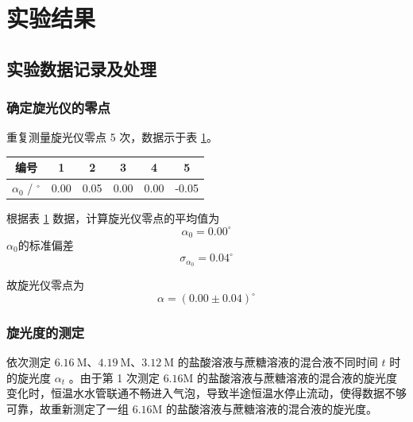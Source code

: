 \section{实验结果}

\subsection{实验数据记录及处理}

\subsubsection{确定旋光仪的零点}

重复测量旋光仪零点 5 次，数据示于表 \ref{tab:1}。
 
\begin{table}[htbp]
    \centering
    \begin{tabular}{c|ccccc}
        \toprule
        编号 & 1 & 2 & 3 & 4 & 5  \\
        \midrule
        $\alpha_0$ / ${}^{\circ}$ & 0.00 & 0.05 & 0.00 & 0.00 & -0.05\\
        \bottomrule
    \end{tabular}
    \label{tab:1}
\end{table}

根据表 \ref{tab:1} 数据，计算旋光仪零点的平均值为
\begin{equation*}
    \alpha_0=0.00^\circ
\end{equation*}
$\alpha_0$的标准偏差
\begin{equation*}
    \sigma_{\alpha_0} = 0.04^\circ
\end{equation*}

故旋光仪零点为
\begin{equation*}
    \alpha=(0.00 \pm 0.04)^{\circ}
\end{equation*}

\subsubsection{旋光度的测定}

依次测定 $6.16 \mathrm{~M} $、$ 4.19 \mathrm{~M} $、$ 3.12 \mathrm{~M} $ 的盐酸溶液与蔗糖溶液的混合液不同时间 $t$ 时的旋光度 $\alpha_t$ 。由于第 1 次测定 $6.16 \mathrm{M}$ 的盐酸溶液与蔗糖溶液的混合液的旋光度变化时，恒温水水管联通不畅进入气泡，导致半途恒温水停止流动，使得数据不够可靠，故重新测定了一组 $6.16 \mathrm{M}$ 的盐酸溶液与蔗糖溶液的混合液的旋光度。

